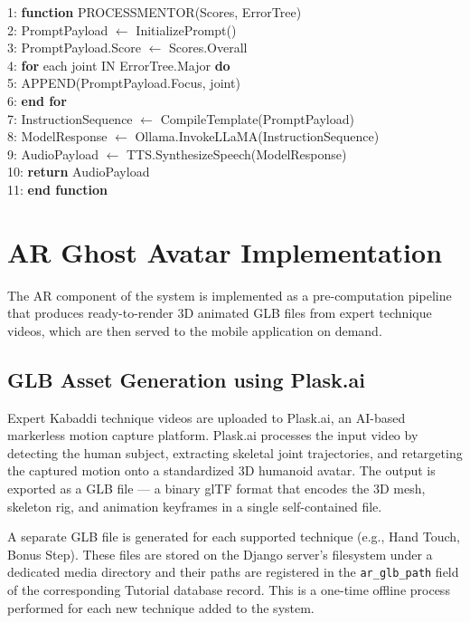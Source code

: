 \begin{sloppypar}
1: \textbf{function} PROCESSMENTOR(Scores, ErrorTree)\\
2: \quad PromptPayload $\leftarrow$ InitializePrompt()\\
3: \quad PromptPayload.Score $\leftarrow$ Scores.Overall\\
4: \quad \textbf{for} each joint IN ErrorTree.Major \textbf{do}\\
5: \qquad APPEND(PromptPayload.Focus, joint)\\
6: \quad \textbf{end for}\\
7: \quad InstructionSequence $\leftarrow$ CompileTemplate(PromptPayload)\\
8: \quad ModelResponse $\leftarrow$ Ollama.InvokeLLaMA(InstructionSequence)\\
9: \quad AudioPayload $\leftarrow$ TTS.SynthesizeSpeech(ModelResponse)\\
10: \quad \textbf{return} AudioPayload\\
11: \textbf{end function}
\algofooter


\section{AR Ghost Avatar Implementation}

The AR component of the system is implemented as a pre-computation pipeline that produces ready-to-render 3D animated GLB files from expert technique videos, which are then served to the mobile application on demand.

\subsection{GLB Asset Generation using Plask.ai}

Expert Kabaddi technique videos are uploaded to Plask.ai, an AI-based markerless motion capture platform. Plask.ai processes the input video by detecting the human subject, extracting skeletal joint trajectories, and retargeting the captured motion onto a standardized 3D humanoid avatar. The output is exported as a GLB file — a binary glTF format that encodes the 3D mesh, skeleton rig, and animation keyframes in a single self-contained file.

A separate GLB file is generated for each supported technique (e.g., Hand Touch, Bonus Step). These files are stored on the Django server's filesystem under a dedicated media directory and their paths are registered in the \texttt{ar\_glb\_path} field of the corresponding Tutorial database record. This is a one-time offline process performed for each new technique added to the system.


\end{sloppypar}
